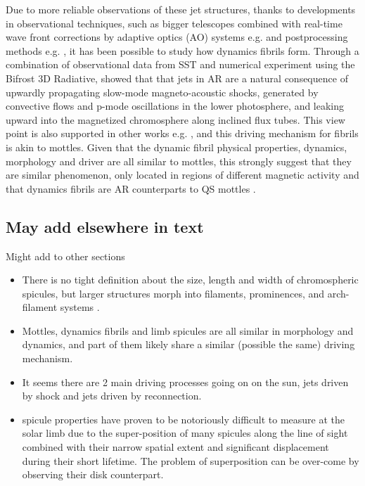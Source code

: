 \documentclass[12pt]{ociamthesis}
\begin{document}
\par Due to more reliable observations of these jet structures, thanks to developments in observational techniques, such as bigger telescopes combined with real-time wave front corrections by adaptive optics (AO) systems e.g. \citep{Scharmer2003SPIE4853370S,Rimmele2000SPIE4007218R} and postprocessing methods e.g. \citep{van2005SoPh228191V,von1993AA268374V}, it has been possible to study how dynamics fibrils form. Through a combination of observational data from SST and numerical experiment using the Bifrost 3D Radiative, \cite{Hansteen2006ApJ} showed that that jets in AR are a natural consequence of upwardly propagating slow-mode magneto-acoustic shocks, generated by convective flows and p-mode oscillations in the lower photosphere, and leaking upward into the magnetized chromosphere along inclined flux tubes. This view point is also supported in other works e.g. \citep{Heggland2007ApJ6661277H,De_Pontieu2007ApJ,Pontieu2004Natur,Suematsu1990LNP367211S}, and this driving mechanism for fibrils is akin to mottles. Given that the dynamic fibril physical properties, dynamics, morphology and driver are all similar to mottles, this strongly suggest that they are similar phenomenon, only located in regions of different magnetic activity and that dynamics fibrils are AR counterparts to QS mottles \citep{Rouppe2007ApJ660L169R}.
\subsection{May add elsewhere in text}
\par Might add to other sections
\begin{itemize}
\item There is no tight definition about the size, length and width of chromospheric spicules, but larger structures morph into filaments, prominences, and arch-filament systems \citep{Aschwanden2019ASSL}.
\item Mottles, dynamics fibrils and limb spicules are all similar in morphology and dynamics, and part of them likely share a similar (possible the same) driving mechanism. 
\item \citep{Tsiropoula2012}
\subitem It seems there are 2 main driving processes going on on the sun, jets driven by shock and jets driven by reconnection.
\item \cite{Sekse2013ApJ764164S}
\subitem  spicule properties have proven to be notoriously difficult to measure at the solar limb due to the super-position of many spicules along the line of sight combined with their narrow spatial extent and significant displacement during their short lifetime. The problem of superposition can be over-come by observing their disk counterpart.
\end{itemize}
\end{document}
